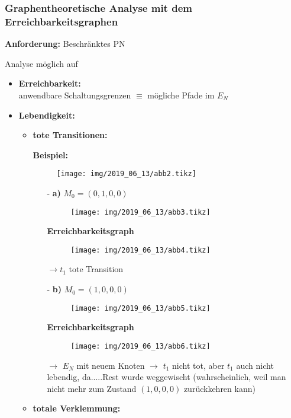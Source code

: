 \subsubsection{Graphentheoretische Analyse mit dem Erreichbarkeitsgraphen}
\textbf{Anforderung:} Beschränktes PN

Analyse möglich auf 

\begin{itemize}[align=left]
	\item{\textbf{Erreichbarkeit:}} \\
	anwendbare Schaltungsgrenzen $\equiv$ mögliche Pfade im $E_N$
	\item{\textbf{Lebendigkeit:}} 
	
	\begin{itemize}
		\item \textbf{tote Transitionen: }  \newline
		
			\textbf{Beispiel:}
			 \begin{figure}[H]
				\centering
				\texttt{[image: img/2019\_06\_13/abb2.tikz]}
			\end{figure}
		
			\begin{itemize}
			\item[-]{\textbf{a)}} $M_0 = (0,1,0,0)$
			 
			\begin{figure}[H]
				\centering
				\texttt{[image: img/2019\_06\_13/abb3.tikz]}
			\end{figure}
			
			\textbf{Erreichbarkeitsgraph}
			
			\begin{figure}[H]
				\centering
				\texttt{[image: img/2019\_06\_13/abb4.tikz]}
			\end{figure}
			$\rightarrow t_1$ tote Transition
			
			\item[-]{\textbf{b)}} $M_0 = (1,0,0,0)$
			\begin{figure}[H]
				\centering
				\texttt{[image: img/2019\_06\_13/abb5.tikz]}
			\end{figure}
			
			\textbf{Erreichbarkeitsgraph}
			
			\begin{figure}[H]
				\centering
				\texttt{[image: img/2019\_06\_13/abb6.tikz]}
			\end{figure}
			$\rightarrow$ $E_N$ mit neuem Knoten $\rightarrow$ $t_1$ nicht tot, aber $t_1$ auch nicht lebendig, da.....Rest wurde weggewischt (wahrscheinlich, weil man nicht mehr zum Zustand $(1,0,0,0)$ zurückkehren kann) %
		\end{itemize}
		\item \textbf{totale Verklemmung:} 
	\end{itemize}	


\end{itemize}
